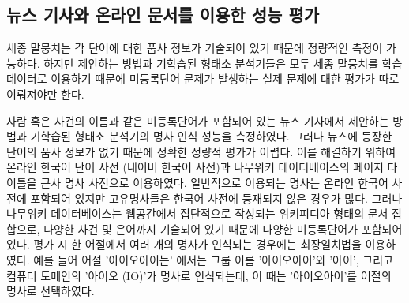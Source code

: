 \documentclass[oneside, ko,phd]{snuthesis_utf8_kor}
\begin{document}
\begin{table}[ht]
\small
\centering
\caption{세종 말뭉치에서 명사로 추출된 빈도수가 작은 12 개의 명사 예시 (Logistic Regression 의 판별 확률, 출현 빈도수)}
\label{tab:sejong_infrequent}
\end{table}

\begin{table}[ht]
\small
\centering
\caption{세종 말뭉치에서 명사로 추출된 12 개의 명사 예시 (정렬 기준 = 판별 확률 $\times$ 출현 빈도수)}
\label{tab:sejong_frequent}
\end{table}


\subsection{뉴스 기사와 온라인 문서를 이용한 성능 평가}

세종 말뭉치는 각 단어에 대한 품사 정보가 기술되어 있기 때문에 정량적인 측정이 가능하다.
하지만 제안하는 방법과 기학습된 형태소 분석기들은 모두 세종 말뭉치를 학습 데이터로 이용하기 때문에 미등록단어 문제가 발생하는 실제 문제에 대한 평가가 따로 이뤄져야만 한다.

사람 혹은 사건의 이름과 같은 미등록단어가 포함되어 있는 뉴스 기사에서 제안하는 방법과 기학습된 형태소 분석기의 명사 인식 성능을 측정하였다.
그러나 뉴스에 등장한 단어의 품사 정보가 없기 때문에 정확한 정량적 평가가 어렵다.
이를 해결하기 위하여 온라인 한국어 단어 사전 (네이버 한국어 사전)과 나무위키 데이터베이스의 페이지 타이틀을 근사 명사 사전으로 이용하였다.
일반적으로 이용되는 명사는 온라인 한국어 사전에 포함되어 있지만 고유명사들은 한국어 사전에 등재되지 않은 경우가 많다.
그러나 나무위키 데이터베이스는 웹공간에서 집단적으로 작성되는 위키피디아 형태의 문서 집합으로, 다양한 사건 및 은어까지 기술되어 있기 때문에 다양한 미등록단어가 포함되어 있다.
평가 시 한 어절에서 여러 개의 명사가 인식되는 경우에는 최장일치법을 이용하였다.
예를 들어 어절 '아이오아이는' 에서는 그룹 이름 '아이오아이'와 '아이', 그리고 컴퓨터 도메인의 '아이오 (IO)'가 명사로 인식되는데, 이 때는 '아이오아이'를 어절의 명사로 선택하였다.
\end{document}
